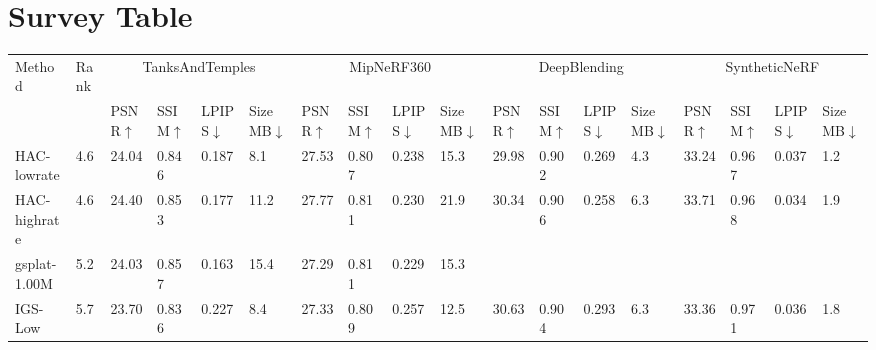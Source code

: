 \section*{Survey Table}
{
\footnotesize
\setlength{\tabcolsep}{3pt}

\begin{adjustbox}{center}
\begin{tabular}{ll|llll|llll|llll|llll}
\toprule
Method & Rank & \multicolumn{4}{c|}{TanksAndTemples} & \multicolumn{4}{c|}{MipNeRF360} & \multicolumn{4}{c|}{DeepBlending} & \multicolumn{4}{c}{SyntheticNeRF} \\
 & \tiny  & \tiny PSNR$\uparrow$ & \tiny SSIM$\uparrow$ & \tiny LPIPS$\downarrow$ & \tiny \makecell{Size \\ MB$\downarrow$} & \tiny PSNR$\uparrow$ & \tiny SSIM$\uparrow$ & \tiny LPIPS$\downarrow$ & \tiny \makecell{Size \\ MB$\downarrow$} & \tiny PSNR$\uparrow$ & \tiny SSIM$\uparrow$ & \tiny LPIPS$\downarrow$ & \tiny \makecell{Size \\ MB$\downarrow$} & \tiny PSNR$\uparrow$ & \tiny SSIM$\uparrow$ & \tiny LPIPS$\downarrow$ & \tiny \makecell{Size \\ MB$\downarrow$} \\
\midrule
HAC-lowrate & \cellcolor{lightred}4.6 & 24.04 & 0.846 & \cellcolor{lightyellow}0.187 & \cellcolor{lightred}8.1 & 27.53 & 0.807 & 0.238 & \cellcolor{lightorange}15.3 & 29.98 & 0.902 & 0.269 & \cellcolor{lightred}4.3 & 33.24 & 0.967 & 0.037 & \cellcolor{lightred}1.2 \\
HAC-highrate & \cellcolor{lightred}4.6 & \cellcolor{lightyellow}24.40 & \cellcolor{lightyellow}0.853 & \cellcolor{lightorange}0.177 & 11.2 & \cellcolor{lightorange}27.77 & 0.811 & 0.230 & 21.9 & 30.34 & 0.906 & 0.258 & \cellcolor{lightyellow}6.3 & \cellcolor{lightorange}33.71 & 0.968 & 0.034 & \cellcolor{lightyellow}1.9 \\
gsplat-1.00M & \cellcolor{lightorange}5.2 & 24.03 & \cellcolor{lightorange}0.857 & \cellcolor{lightred}0.163 & 15.4 & 27.29 & 0.811 & \cellcolor{lightyellow}0.229 & \cellcolor{lightorange}15.3 &  &  &  &  &  &  &  &  \\
IGS-Low & \cellcolor{lightyellow}5.7 & 23.70 & 0.836 & 0.227 & \cellcolor{lightyellow}8.4 & 27.33 & 0.809 & 0.257 & \cellcolor{lightred}12.5 & \cellcolor{lightorange}30.63 & 0.904 & 0.293 & \cellcolor{lightyellow}6.3 & 33.36 & \cellcolor{lightorange}0.971 & 0.036 & \cellcolor{lightorange}1.8 \\

\end{tabular}
\end{adjustbox}}
